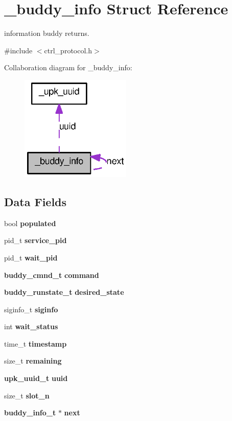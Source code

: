 \section{\_\-buddy\_\-info Struct Reference}
\label{struct__buddy__info}


information buddy returns.  




{\ttfamily \#include $<$ctrl\_\-protocol.h$>$}



Collaboration diagram for \_\-buddy\_\-info:\nopagebreak
\begin{figure}[H]
\begin{center}
\leavevmode
\includegraphics[width=149pt]{struct__buddy__info__coll__graph}
\end{center}
\end{figure}
\subsection*{Data Fields}
\begin{DoxyCompactItemize}
\item 
bool {\bf populated}
\item 
pid\_\-t {\bf service\_\-pid}
\item 
pid\_\-t {\bf wait\_\-pid}
\item 
{\bf buddy\_\-cmnd\_\-t} {\bf command}
\item 
{\bf buddy\_\-runstate\_\-t} {\bf desired\_\-state}
\item 
siginfo\_\-t {\bf siginfo}
\item 
int {\bf wait\_\-status}
\item 
time\_\-t {\bf timestamp}
\item 
size\_\-t {\bf remaining}
\item 
{\bf upk\_\-uuid\_\-t} {\bf uuid}
\item 
size\_\-t {\bf slot\_\-n}
\item 
{\bf buddy\_\-info\_\-t} $\ast$ {\bf next}
\end{DoxyCompactItemize}


